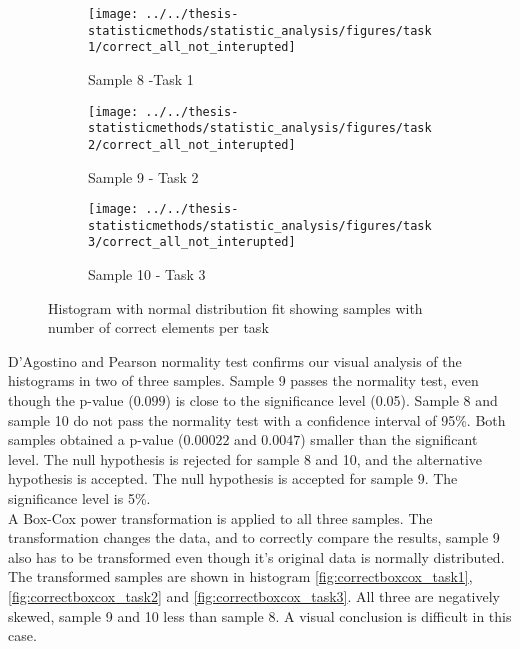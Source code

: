 \begin{figure}[H]
 	\centering
	 \begin{subfigure}[b]{0.3\textwidth}
	 	\centering
	 	\texttt{[image: ../../thesis-statisticmethods/statistic\_analysis/figures/task1/correct\_all\_not\_interupted]}
	 	\caption{Sample 8 -Task 1}
	 	\label{fig:correctallnotinterupted_task1}
	 \end{subfigure}
	\begin{subfigure}[b]{0.3\textwidth}
		\centering
		\texttt{[image: ../../thesis-statisticmethods/statistic\_analysis/figures/task2/correct\_all\_not\_interupted]}
		\caption{Sample 9 - Task 2}
		\label{fig:correctallnotinterupted_task2}
	\end{subfigure}
	 \begin{subfigure}[b]{0.3\textwidth}
	 	\centering
	 	\texttt{[image: ../../thesis-statisticmethods/statistic\_analysis/figures/task3/correct\_all\_not\_interupted]}
	 	\caption{Sample 10 - Task 3}
	 	\label{fig:correctallnotinterupted_task3}
	 \end{subfigure}
 \caption{Histogram with normal distribution fit showing samples with number of correct elements per task}
 \end{figure}
 
 D'Agostino and Pearson normality test confirms our visual analysis of the histograms in two of three samples. Sample 9 passes the normality test, even though the p-value ($0.099$) is close to the significance level (0.05). Sample 8 and sample 10 do not pass the normality test with a confidence interval of 95\%. Both samples obtained a p-value ($0.00022$ and $0.0047$) smaller than the significant level. The null hypothesis is rejected for sample 8 and 10, and the alternative hypothesis is accepted. The null hypothesis is accepted for sample 9. The significance level is 5\%. \\[0.2cm]

A Box-Cox power transformation is applied to all three samples. The transformation changes the data, and to correctly compare the results, sample 9 also has to be transformed even though it's original data is normally distributed. The transformed samples are shown in histogram \ref{fig:correctboxcox_task1}, \ref{fig:correctboxcox_task2} and \ref{fig:correctboxcox_task3}. All three are negatively skewed, sample 9 and 10 less than sample 8. A visual conclusion is difficult in this case. \\[0.2cm]


